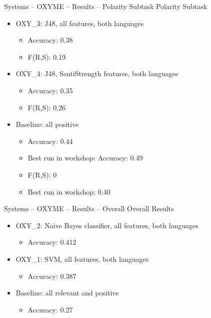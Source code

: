 \documentclass[12pt,a4paper]{beamer}
\begin{document}
\begin{frame}{Systems -- OXYME -- Results -- Polarity Subtask}
Polarity Subtask
\begin{itemize}
\item OXY\_3: J48, all features, both languages
  \begin{itemize}
  \item Accuracy: 0.38
  \item F(R,S): 0.19
  \end{itemize}
\item OXY\_4: J48, SentiStrength features, both languages
  \begin{itemize}
   \item Accuracy: 0.35
   \item F(R,S): 0.26
  \end{itemize}
\item Baseline: all positive
  \begin{itemize}
  \item Accuracy: 0.44
  \item Best run in workshop: Accuracy: 0.49
  \item F(R,S): 0
  \item Best run in workshop: 0.40
  \end{itemize}
\end{itemize}

\end{frame}

\begin{frame}{Systems -- OXYME -- Results -- Overall}
Overall Results
\begin{itemize}
 \item OXY\_2: Naive Bayes classifier, all features, both languages
  \begin{itemize}
  \item Accuracy: 0.412
  \end{itemize}
\item OXY\_1: SVM, all features, both languages
  \begin{itemize}
  \item Accuracy: 0.387
  \end{itemize}
\item Baseline: all relevant and positive
  \begin{itemize}
  \item Accuracy: 0.27
  \end{itemize}
\end{itemize}

\end{frame}
\end{document}
